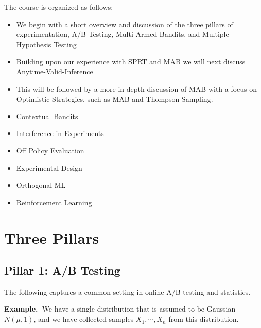 \documentclass[11pt]{article}
\newcommand{\example}{\noindent\textbf{Example.\  }}
\newcommand{\1}{\mathbf{1}}
\begin{document}
The course is organized as follows:
\begin{itemize}
    \item We begin with a short overview and discussion of the three pillars of experimentation, A/B Testing, Multi-Armed Bandits, and Multiple Hypothesis Testing
    \item Building upon our experience with SPRT and MAB we will next discuss Anytime-Valid-Inference
    \item This will be followed by a more in-depth discussion of MAB with a focus on Optimistic Strategies, such as MAB and Thompson Sampling. 
    \item Contextual Bandits
    \item Interference in Experiments
    \item Off Policy Evaluation
    \item Experimental Design
    \item Orthogonal ML
    \item Reinforcement Learning
\end{itemize}

\section{Three Pillars}

\subsection{Pillar 1: A/B Testing}
The following captures a common setting in online A/B testing and statistics.

\example We have a single distribution that is assumed to be Gaussian $N(\mu,1)$, and we have collected samples $X_1, \cdots, X_n$ from this distribution. 
\end{document}
